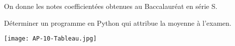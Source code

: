 
\begin{minipage}{0.48\linewidth}
On donne les notes coefficientées obtenues au Baccalauréat en série S.

Déterminer un programme en Python qui attribue la moyenne à l'examen.
\end{minipage}
\hfill
\begin{minipage}{0.48\linewidth}
\texttt{[image: AP-10-Tableau.jpg]} 
\end{minipage}
